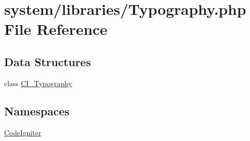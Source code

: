 \hypertarget{_typography_8php}{\section{system/libraries/\-Typography.php File Reference}
\label{_typography_8php}
}
\subsection*{Data Structures}
\begin{DoxyCompactItemize}
\item 
class \hyperlink{class_c_i___typography}{C\-I\-\_\-\-Typography}
\end{DoxyCompactItemize}
\subsection*{Namespaces}
\begin{DoxyCompactItemize}
\item 
\hyperlink{namespace_code_igniter}{Code\-Igniter}
\end{DoxyCompactItemize}
